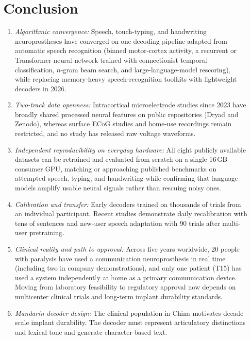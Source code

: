 \documentclass[11pt]{article}
\begin{document}
\section{Conclusion}

\begin{enumerate}[leftmargin=1.5em,itemsep=2pt]
\item \emph{Algorithmic convergence:} Speech, touch-typing, and
handwriting neuroprostheses have converged on one decoding pipeline
adapted from automatic speech recognition (binned motor-cortex activity,
a recurrent or Transformer neural network trained with connectionist
temporal classification, $n$-gram beam search, and large-language-model
rescoring), while replacing memory-heavy speech-recognition toolkits
with lightweight decoders in 2026.
\item \emph{Two-track data openness:} Intracortical microelectrode
studies since 2023 have broadly shared processed neural features on
public repositories (Dryad and Zenodo), whereas surface ECoG studies and
home-use recordings remain restricted, and no study has released raw
voltage waveforms.
\item \emph{Independent reproducibility on everyday hardware:} All eight
publicly available datasets can be retrained and evaluated from scratch
on a single 16\,GB consumer GPU, matching or approaching published
benchmarks on attempted speech, typing, and handwriting while confirming
that language models amplify usable neural signals rather than rescuing
noisy ones.
\item \emph{Calibration and transfer:} Early decoders trained on
thousands of trials from an individual participant. Recent studies
demonstrate daily recalibration with tens of sentences and new-user
speech adaptation with 90 trials after multi-user pretraining.
\item \emph{Clinical reality and path to approval:} Across five years
worldwide, 20 people with paralysis have used a communication
neuroprosthesis in real time (including two in company demonstrations),
and only one patient (T15) has used a system independently at home as a
primary communication device. Moving from laboratory feasibility to
regulatory approval now depends on multicenter clinical trials and
long-term implant durability standards.
\item \emph{Mandarin decoder design:} The clinical population in China
motivates decade-scale implant durability. The decoder must represent
articulatory distinctions and lexical tone and generate character-based
text.
\end{enumerate}
\end{document}
